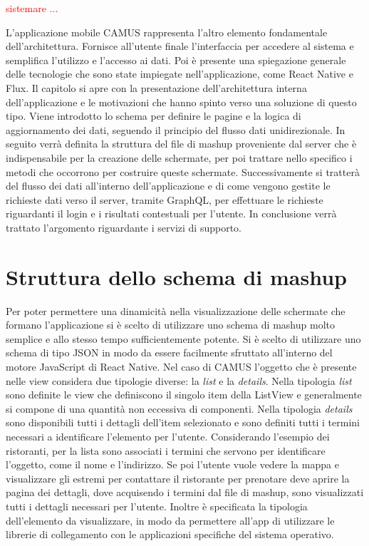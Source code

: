 \textcolor{red}{sistemare ...}

L'applicazione mobile CAMUS rappresenta l'altro elemento fondamentale dell'ar\-chi\-tet\-tu\-ra. Fornisce all'utente finale l'interfaccia per accedere al sistema e semplifica l'utilizzo e l'accesso ai dati. Poi è presente una spiegazione generale delle tecnologie che sono state impiegate nell'applicazione, come React Native e Flux. Il capitolo si apre con la presentazione dell'architettura interna dell'applicazione e le motivazioni che hanno spinto verso una soluzione di questo tipo. Viene introdotto lo schema per definire le pagine e la logica di aggiornamento dei dati, seguendo il principio del flusso dati unidirezionale. In seguito verrà definita la struttura del file di mashup proveniente dal server che è indispensabile per la creazione delle schermate, per poi trattare nello specifico i metodi che occorrono per costruire queste schermate.
Successivamente si tratterà del flusso dei dati all'interno dell'applicazione e di come vengono gestite le richieste dati verso il server, tramite GraphQL, per effettuare le richieste riguardanti il login e i risultati contestuali per l'utente. In conclusione verrà trattato l'argomento riguardante i servizi di supporto.

\section{Struttura dello schema di mashup}

Per poter permettere una dinamicità nella visualizzazione delle schermate che formano l'applicazione si è scelto di utilizzare uno schema di mashup molto semplice e allo stesso tempo sufficientemente potente. Si è scelto di utilizzare uno schema di tipo JSON in modo da essere facilmente sfruttato all'interno del motore JavaScript di React Native. 
Nel caso di CAMUS l'oggetto che è presente nelle view considera due tipologie diverse: la \emph{list} e la \emph{details}. Nella tipologia \emph{list} sono definite le view che definiscono il singolo item della ListView e generalmente si compone di una quantità non eccessiva di componenti.
Nella tipologia \emph{details} sono disponibili tutti i dettagli dell'item selezionato e sono definiti tutti i termini necessari a identificare l'elemento per l'utente.
Considerando l'esempio dei ristoranti, per la lista sono associati i termini che servono per identificare l'oggetto, come il nome e l'indirizzo. Se poi l'utente vuole vedere la mappa e visualizzare gli estremi per contattare il ristorante per prenotare deve aprire la pagina dei dettagli, dove acquisendo i termini dal file di mashup, sono visualizzati tutti i dettagli necessari per l'utente. Inoltre è specificata la tipologia dell'elemento da visualizzare, in modo da permettere all'app di utilizzare le librerie di collegamento con le applicazioni specifiche del sistema operativo.

